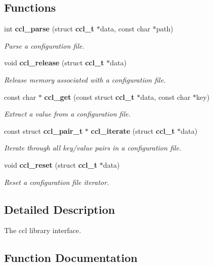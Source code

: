 \subsection*{Functions}
\begin{CompactItemize}
\item 
int {\bf ccl\_\-parse} (struct {\bf ccl\_\-t} $\ast$data, const char $\ast$path)
\begin{CompactList}\small\item\em Parse a configuration file. \item\end{CompactList}\item 
void {\bf ccl\_\-release} (struct {\bf ccl\_\-t} $\ast$data)
\begin{CompactList}\small\item\em Release memory associated with a configuration file. \item\end{CompactList}\item 
const char $\ast$ {\bf ccl\_\-get} (const struct {\bf ccl\_\-t} $\ast$data, const char $\ast$key)
\begin{CompactList}\small\item\em Extract a value from a configuration file. \item\end{CompactList}\item 
const struct {\bf ccl\_\-pair\_\-t} $\ast$ {\bf ccl\_\-iterate} (struct {\bf ccl\_\-t} $\ast$data)
\begin{CompactList}\small\item\em Iterate through all key/value pairs in a configuration file. \item\end{CompactList}\item 
void {\bf ccl\_\-reset} (struct {\bf ccl\_\-t} $\ast$data)
\begin{CompactList}\small\item\em Reset a configuration file iterator. \item\end{CompactList}\end{CompactItemize}


\subsection{Detailed Description}
The ccl library interface. 



\subsection{Function Documentation}
